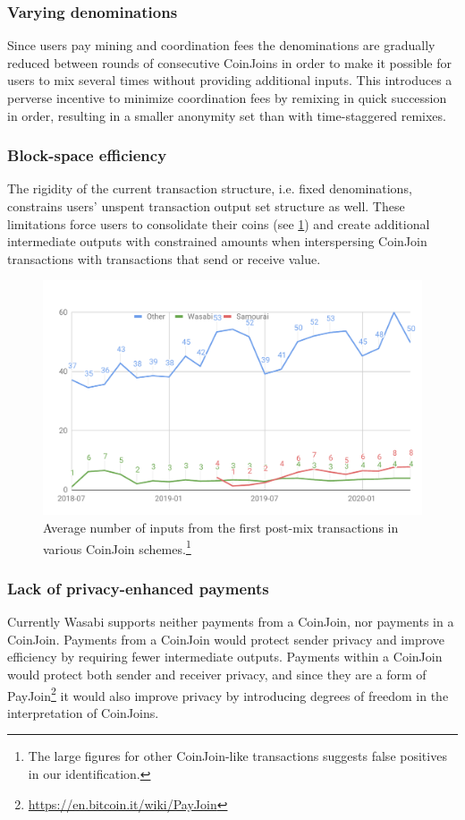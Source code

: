 \documentclass[a4paper]{article}
\begin{document}
\subsubsection{Varying denominations} Since users pay mining and coordination fees the denominations are gradually reduced between rounds of consecutive CoinJoins in order to make it possible for users to mix several times without providing additional inputs. This introduces a perverse incentive to minimize coordination fees by remixing in quick succession in order, resulting in a smaller anonymity set than with time-staggered remixes.

\subsubsection{Block-space efficiency}

The rigidity of the current transaction structure, i.e. fixed denominations, constrains users' unspent transaction output set structure as well. These limitations force users to consolidate their coins (see \cref{fig:postmixmerging}) and create additional intermediate outputs with constrained amounts when interspersing CoinJoin transactions with transactions that send or receive value.

\begin{figure}[h!]
    \centering
    \includegraphics[scale=0.4]{Figures/postMixInputMerging.pdf}
    \caption[]{Average number of inputs from the first post-mix transactions in various CoinJoin schemes.\footnote{The large figures for other CoinJoin-like transactions suggests false positives in our identification.}}
    \label{fig:postmixmerging}
\end{figure}

\subsubsection{Lack of privacy-enhanced payments} Currently Wasabi supports neither payments from a CoinJoin, nor payments in a CoinJoin. Payments from a CoinJoin would protect sender privacy and improve efficiency by requiring fewer intermediate outputs. Payments within a CoinJoin would protect both sender and receiver privacy, and since they are a form of PayJoin\footnote{\url{https://en.bitcoin.it/wiki/PayJoin}} it would also improve privacy by introducing degrees of freedom in the interpretation of CoinJoins.
\end{document}
